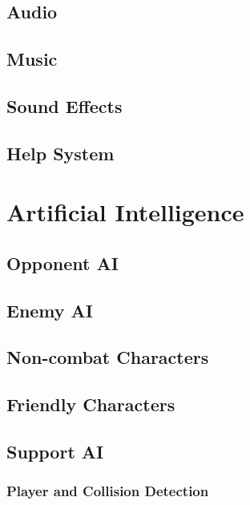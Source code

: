 \documentclass[12pt,titlepage]{article}
\begin{document}
\subsection{Audio}

\subsection{Music}

\subsection{Sound Effects}

\subsection{Help System}

\newpage
\section{Artificial Intelligence}

\subsection{Opponent AI}

\subsection{Enemy AI}

\subsection{Non-combat Characters}

\subsection{Friendly Characters}

\subsection{Support AI}

\subsubsection{Player and Collision Detection}
\end{document}
